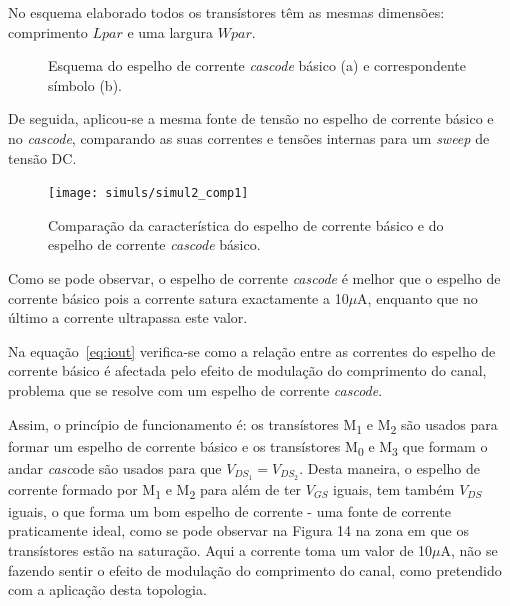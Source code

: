 \documentclass[11pt]{article}
\numberwithin{equation}{section}
\begin{document}
No esquema elaborado todos os transístores têm as mesmas dimensões: comprimento $Lpar$ e uma largura $Wpar$.

\begin{figure}[H]
	\centering
	\hspace{2mm}
	\vspace{-0.8em}
	\caption{Esquema do espelho de corrente \textit{cascode} básico (a) e correspondente símbolo (b).}
	\vspace{-0.8em}
\end{figure}

De seguida, aplicou-se a mesma fonte de tensão no espelho de corrente básico e no \textit{cascode}, comparando as suas correntes e tensões internas para um \textit{sweep} de tensão DC.

\begin{figure}[h]
	\centering
	\texttt{[image: simuls/simul2\_comp1]}
	\vspace{-0.8em}
	\caption{Comparação da característica do espelho de corrente básico e do espelho de corrente \textit{cascode} básico.}
	\vspace{-0.8em}
\end{figure} 

Como se pode observar, o espelho de corrente \textit{cascode} é melhor que o espelho de corrente básico pois a corrente satura exactamente a 10$\mu$A, enquanto que no último a corrente ultrapassa este valor.

Na equação~\ref{eq:iout} verifica-se como a relação entre as correntes do espelho de corrente básico é afectada pelo efeito de modulação do comprimento do canal, problema que se resolve com um espelho de corrente \textit{cascode}.

Assim, o princípio de funcionamento é: os transístores M\textsubscript{1} e M\textsubscript{2} são usados para formar um espelho de corrente básico e os transístores M\textsubscript{0} e M\textsubscript{3} que formam o andar \textit{casc}ode são usados para que $V_{DS_{1}} = V_{DS_{2}}$. Desta maneira, o espelho de corrente formado por M\textsubscript{1} e M\textsubscript{2} para além de ter $V_{GS}$ iguais, tem também $V_{DS}$ iguais, o que forma um bom espelho de corrente - uma fonte de corrente praticamente ideal, como se pode observar na Figura 14 na zona em que os transístores estão na saturação. Aqui a corrente toma um valor de 10$\mu$A, não se fazendo sentir o efeito de modulação do comprimento do canal, como pretendido com a aplicação desta topologia.
\end{document}

